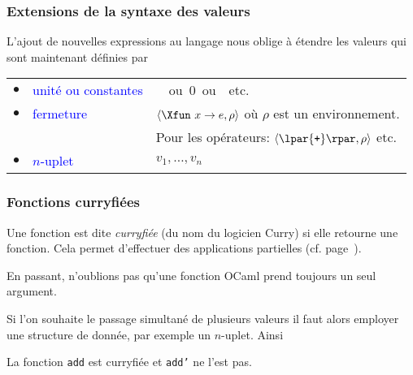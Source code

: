 % 
\begin{frame}
\frametitle{Extensions de la syntaxe des valeurs}

L'ajout de nouvelles expressions au langage nous oblige à étendre les
valeurs qui sont maintenant définies par

\bigskip

\begin{tabular}{rll}
    $\bullet$
  & \textcolor{blue}{unité ou constantes}
  & \unit \ ou \textsf{0} ou \Xtrue{} etc.\\
    $\bullet$
  & \textcolor{blue}{fermeture}
  & $\langle\Xfun \,\, x \rightarrow e, \rho\rangle$ où $\rho$ est un
    environnement.\\
  & 
  & Pour les opérateurs: $\langle\lpar{\texttt{+}}\rpar, \rho\rangle$
    etc.\\
    $\bullet$
  & \textcolor{blue}{$n$-uplet}
  & $v_1, \ldots, v_n$
\end{tabular}

\end{frame}

% 
\begin{frame}
\frametitle{Fonctions curryfiées}

Une fonction est dite \emph{curryfiée} (du nom du logicien Curry) si
elle retourne une fonction. Cela permet d'effectuer des applications
partielles (cf. page~\pageref{application_partielle}).

\bigskip

En passant, n'oublions pas qu'une fonction OCaml prend toujours un
seul argument.

\bigskip

Si l'on souhaite le passage simultané de plusieurs valeurs il faut
alors employer une structure de donnée, par exemple un
$n$-uplet. Ainsi





\bigskip

La fonction \texttt{\small add} est curryfiée et \texttt{\small add'}
ne l'est pas.

\end{frame}

